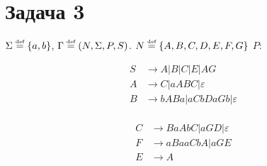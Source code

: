 \documentclass[a4paper]{article}
\def\eps{\varepsilon}
\def\eqdef{\overset{\mbox{\tiny def}}{=}}
\begin{document}
\section*{Задача 3}
$\Sigma\eqdef\{a,b\}$, $\Gamma\eqdef(N,\Sigma,P,S)$. $N\eqdef\{A,B,C,D,E,F,G\}$ $P:$
\vspace{-7ex}
\begin{multicols}{2}
	\begin{align*}
		S &\to A|B|C|E|AG \\
		A &\to C |aABC|\eps\\
		B &\to bABa|aCbDaGb|\eps\\
	\end{align*}

	\begin{align*}
		C &\to BaAbC|aGD|\eps\\
		F &\to aBaaCbA|aGE\\
		E &\to A\\			
	\end{align*}	
\end{multicols}
\vspace{-7ex}
\end{document}
